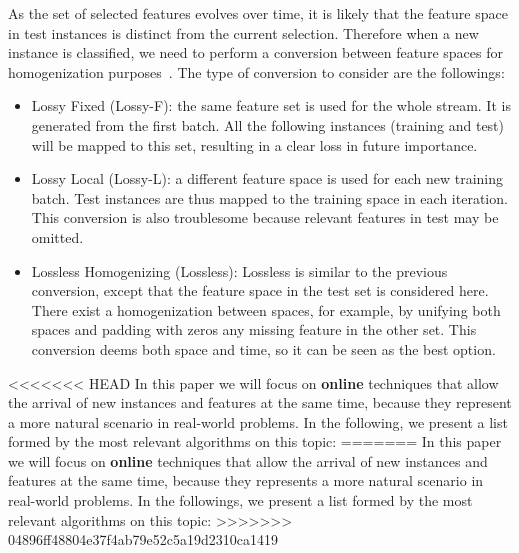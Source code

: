 \documentclass[preprint,12pt]{elsarticle}
\begin{document}
As the set of selected features evolves over time, it is likely that the feature space in test instances is distinct from the current selection. Therefore when a new instance is classified, we need to perform a conversion between feature spaces for homogenization purposes~\cite{masud10}. The type of conversion to consider are the followings: 
\begin{itemize}
	\item Lossy Fixed (Lossy-F): the same feature set is used for the whole stream. It is generated from the first batch. All the following instances (training and test) will be mapped to this set, resulting in a clear loss in future importance.
	\item Lossy Local (Lossy-L): a different feature space is used for each new training batch. Test instances are thus mapped to the training space in each iteration. This conversion is also troublesome because relevant features in test may be omitted.
	\item Lossless Homogenizing (Lossless): Lossless is similar to the previous conversion, except that the feature space in the test set is considered here. There exist a homogenization between spaces, for example, by unifying both spaces and padding with zeros any missing feature in the other set. This conversion deems both space and time, so it can be seen as the best option.
\end{itemize}

<<<<<<< HEAD
In this paper we will focus on \textbf{online} techniques that allow the arrival of new instances and features at the same time, because they represent a more natural scenario in real-world problems. In the following, we present a list formed by the most relevant algorithms on this topic:
=======
In this paper we will focus on \textbf{online} techniques that allow the arrival of new instances and features at the same time, because they represents a more natural scenario in real-world problems. In the followings, we present a list formed by the most relevant algorithms on this topic:
>>>>>>> 04896ff48804e37f4ab79e52c5a19d2310ca1419
\end{document}
